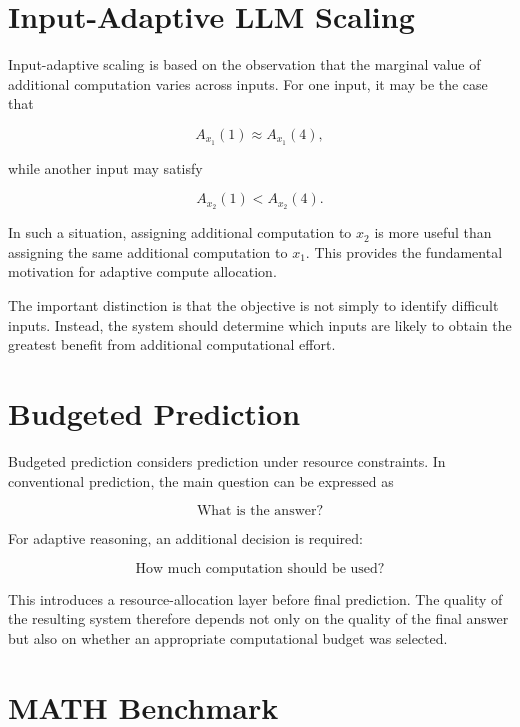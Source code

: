 \documentclass[12pt,a4paper,titlepage]{report}
\begin{document}
\section{Input-Adaptive LLM Scaling}

Input-adaptive scaling is based on the observation that the marginal value of additional computation varies across inputs. For one input, it may be the case that

\begin{equation}
A_{x_1}(1)\approx A_{x_1}(4),
\end{equation}

while another input may satisfy

\begin{equation}
A_{x_2}(1)<A_{x_2}(4).
\end{equation}

In such a situation, assigning additional computation to $x_2$ is more useful than assigning the same additional computation to $x_1$. This provides the fundamental motivation for adaptive compute allocation.

The important distinction is that the objective is not simply to identify difficult inputs. Instead, the system should determine which inputs are likely to obtain the greatest benefit from additional computational effort.

\section{Budgeted Prediction}

Budgeted prediction considers prediction under resource constraints. In conventional prediction, the main question can be expressed as

\begin{equation}
\text{What is the answer?}
\end{equation}

For adaptive reasoning, an additional decision is required:

\begin{equation}
\text{How much computation should be used?}
\end{equation}

This introduces a resource-allocation layer before final prediction. The quality of the resulting system therefore depends not only on the quality of the final answer but also on whether an appropriate computational budget was selected.

\section{MATH Benchmark}
\end{document}
